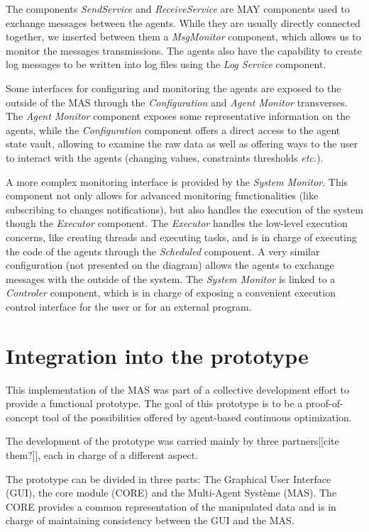 The components \emph{SendService} and \emph{ReceiveService} are MAY components used to exchange messages between the agents. While they are usually directly connected together, we inserted between them a \emph{MsgMonitor} component, which allows us to monitor the messages transmissions. The agents also have the capability to create log messages to be written into log files using the \emph{Log Service} component.

Some interfaces for configuring and monitoring the agents are exposed to the outside of the MAS through the \emph{Configuration} and \emph{Agent Monitor} transverses. The \emph{Agent Monitor} component exposes some representative information on the agents, while the \emph{Configuration} component offers a direct access to the agent state vault, allowing to examine the raw data as well as offering ways to the user to interact with the agents (changing values, constraints thresholds \emph{etc.}).

A more complex monitoring interface is provided by the \emph{System Monitor}. This component not only allows for advanced monitoring functionalities (like subscribing to changes notifications), but also handles the execution of the system though the \emph{Executor} component. The \emph{Executor} handles the low-level execution concerns, like creating threads and executing tasks, and is in charge of executing the code of the agents through the \emph{Scheduled} component. A very similar configuration (not presented on the diagram) allows the agents to exchange messages with the outside of the system. The \emph{System Monitor} is linked to a \emph{Controler} component, which is in charge of exposing a convenient execution control interface for the user or for an external program.

\section{Integration into the prototype}

This implementation of the MAS was part of a collective development effort to provide a functional prototype. The goal of this prototype is to be a proof-of-concept tool of the possibilities offered by agent-based continuous optimization.

The development of the prototype was carried mainly by three partners[[cite them?]], each in charge of a different aspect.

The prototype can be divided in three parts: The Graphical User Interface (GUI), the core module (CORE) and the Multi-Agent Système (MAS). The CORE provides a common representation of the manipulated data and is in charge of maintaining consistency between the GUI and the MAS.

